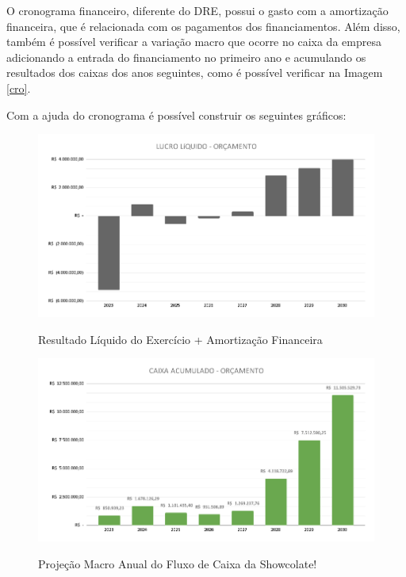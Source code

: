 \documentclass[
	12pt,				%
	openright,			%
	oneside,			%
	a4paper,			%
	english,			%
	french,				%
	spanish,			%
	brazil				%
	]{abntex2}
\begin{document}
O cronograma financeiro, diferente do DRE, possui o gasto com a amortização financeira, que é relacionada com os pagamentos dos financiamentos. Além disso, também é possível verificar a variação macro que ocorre no caixa da empresa adicionando a entrada do financiamento no primeiro ano e acumulando os resultados dos caixas dos anos seguintes, como é possível verificar na Imagem \ref{cro}. 

Com a ajuda do cronograma é possível construir os seguintes gráficos:

\begin{figure}[H]
\begin{center}
\caption{Resultado Líquido do Exercício + Amortização Financeira}
\includegraphics[scale=0.35]{a10.png} 
\label{a10}
\end{center}
\end{figure}

\begin{figure}[H]
\begin{center}
\caption{Projeção Macro Anual do Fluxo de Caixa da Showcolate!}
\includegraphics[scale=0.35]{a11.png} 
\label{a11}
\end{center}
\end{figure}
\end{document}
